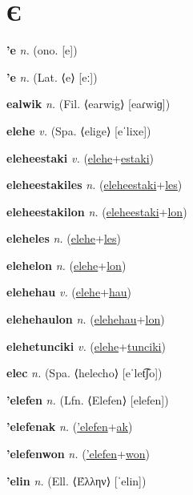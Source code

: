 \section{Є}

\textbf{\hypertarget{'e}{'e}} \textit{n.} (ono. [e])


\textbf{\hypertarget{'e}{'e}} \textit{n.} (Lat. ⟨e⟩ [eː])


\textbf{\hypertarget{ealwik}{ealwik}} \textit{n.} (Fil. ⟨earwig⟩ [eaɾwiɡ])


\textbf{\hypertarget{elehe}{elehe}} \textit{v.} (Spa. ⟨elige⟩ [eˈlixe])


\textbf{\hypertarget{eleheestaki}{eleheestaki}} \textit{v.} (\hyperlink{elehe}{elehe}+\allowbreak \hyperlink{estaki}{estaki})


\textbf{\hypertarget{eleheestakiles}{eleheestakiles}} \textit{n.} (\hyperlink{eleheestaki}{eleheestaki}+\allowbreak \hyperlink{les}{les})


\textbf{\hypertarget{eleheestakilon}{eleheestakilon}} \textit{n.} (\hyperlink{eleheestaki}{eleheestaki}+\allowbreak \hyperlink{lon}{lon})


\textbf{\hypertarget{eleheles}{eleheles}} \textit{n.} (\hyperlink{elehe}{elehe}+\allowbreak \hyperlink{les}{les})


\textbf{\hypertarget{elehelon}{elehelon}} \textit{n.} (\hyperlink{elehe}{elehe}+\allowbreak \hyperlink{lon}{lon})


\textbf{\hypertarget{elehehau}{elehehau}} \textit{v.} (\hyperlink{elehe}{elehe}+\allowbreak \hyperlink{hau}{hau})


\textbf{\hypertarget{elehehaulon}{elehehaulon}} \textit{n.} (\hyperlink{elehehau}{elehehau}+\allowbreak \hyperlink{lon}{lon})


\textbf{\hypertarget{elehetunciki}{elehetunciki}} \textit{v.} (\hyperlink{elehe}{elehe}+\allowbreak \hyperlink{tunciki}{tunciki})


\textbf{\hypertarget{elec}{elec}} \textit{n.} (Spa. ⟨helecho⟩ [eˈlet͡ʃo])


\textbf{\hypertarget{'elefen}{'elefen}} \textit{n.} (Lfn. ⟨Elefen⟩ [elefen])


\textbf{\hypertarget{'elefenak}{'elefenak}} \textit{n.} (\hyperlink{'elefen}{'elefen}+\allowbreak \hyperlink{ak}{ak})


\textbf{\hypertarget{'elefenwon}{'elefenwon}} \textit{n.} (\hyperlink{'elefen}{'elefen}+\allowbreak \hyperlink{won}{won})


\textbf{\hypertarget{'elin}{'elin}} \textit{n.} (Ell. ⟨Έλλην⟩ [ˈelin])


